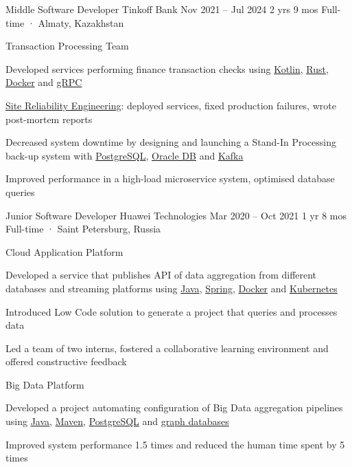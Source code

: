 \documentclass[11pt, a4paper]{style}
\begin{document}
\setcolumnwidth{5.5cm,2.7cm}
\begin{paracol}{2}



    \cvEntry
        {Middle Software Developer} {Tinkoff Bank}
        {Nov 2021 -- Jul 2024} {2 yrs 9 mos}
        {Full-time · Almaty, Kazakhstan}
        {
            Transaction Processing Team \\
            \vspace{-5mm}
            \begin{cvItems}
                \item Developed services performing finance transaction checks using \underline{Kotlin}, \underline{Rust}, \underline{Docker} and \underline{gRPC}
                \item \underline{Site Reliability Engineering}: deployed services, fixed production failures, wrote post-mortem reports
                \item Decreased system downtime by designing and launching a Stand-In Processing back-up system with \underline{PostgreSQL}, \underline{Oracle DB} and \underline{Kafka}
                \item Improved performance in a high-load microservice system, optimised database queries
            \end{cvItems}
        }

    \cvEntry
        {Junior Software Developer} {Huawei Technologies}
        {Mar 2020 -- Oct 2021} {1 yr 8 mos}
        {Full-time · Saint Petersburg, Russia}
        {
            Cloud Application Platform \\
            \vspace{-5mm}
            \begin{cvItems}
                \item Developed a service that publishes API of data aggregation from different databases and streaming platforms using \underline{Java}, \underline{Spring}, \underline{Docker} and \underline{Kubernetes}
                \item Introduced Low Code solution to generate a project that queries and processes data
                \item Led a team of two interns, fostered a collaborative learning environment and offered constructive feedback
            \end{cvItems}
            \vspace{-1mm}
            Big Data Platform \\
            \vspace{-5mm}
            \begin{cvItems}
                \item Developed a project automating configuration of Big Data aggregation pipelines using \underline{Java}, \underline{Maven}, \underline{PostgreSQL} and \underline{graph databases}
                \item Improved system performance 1.5 times and reduced the human time spent by 5 times
            \end{cvItems}
        }


\end{paracol}
\end{document}
